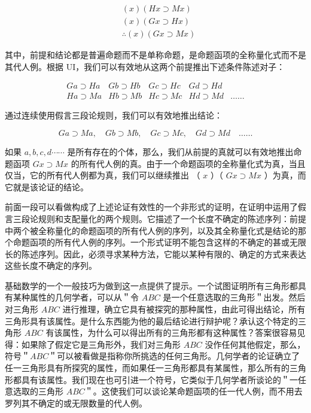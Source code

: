 $$
\begin{aligned}
& (x)(H x \supset M x) \\
& (x)(G x \supset H x) \\
& \therefore(x)(G x \supset M x)
\end{aligned}
$$

其中，前提和结论都是普遍命题而不是单称命题，是命题函项的全称量化式而不是其代人例。根据 UI，我们可以有效地从这两个前提推出下述条件陈述对子：

$$
\begin{array}{lllll}
G a \supset H a & G b \supset H b & G c \supset H c & G d \supset H d & \\
H a \supset M a & H b \supset M b & H c \supset M c & H d \supset M d & \ldots \ldots
\end{array}
$$

通过连续使用假言三段论规则，我们可以有效地推出结论：

$$
G a \supset M a, \quad G b \supset M b, \quad G c \supset M c, \quad G d \supset M d \quad \ldots \ldots
$$

如果 $a, b, c, d \cdots \cdots$ 是所有存在的个体，那么，我们从前提的真就可以有效地推出命题函项 $G x \supset M x$ 的所有代人例的真。由于一个命题函项的全称量化式为真，当且仅当，它的所有代人例都为真，我们可以继续推出 （ $x$ ）（ $G x \supset M x$ ）为真，而它就是该论证的结论。

前面一段可以看做构成了上述论证有效性的一个非形式的证明，在证明中运用了假言三段论规则和支配量化的两个规则。它描述了一个长度不确定的陈述序列：前提中两个被全称量化的命题函项的所有代人例的序列，以及其全称量化式是结论的那个命题函项的所有代人例的序列。一个形式证明不能包含这样的不确定的甚或无限长的陈述序列。因此，必须寻求某种方法，它能以某种有限的、确定的方式来表达这些长度不确定的序列。

基础数学的一个一般技巧为做到这一点提供了提示。一个试图证明所有三角形都具有某种属性的几何学者，可以从＂令 $A B C$ 是一个任意选取的三角形＂出发。然后对三角形 $A B C$ 进行推理，确立它具有被探究的那种属性，由此可得出结论，所有三角形具有该属性。是什么东西能为他的最后结论进行辩护呢？承认这个特定的三角形 $A B C$ 有该属性，为什么可以得出所有的三角形都有这种属性？答案很容易见得：如果除了假定它是三角形外，我们对三角形 $A B C$ 没作任何其他假定，那么，符号＂$A B C$＂可以被看做是指称你所挑选的任何三角形。几何学者的论证确立了任一三角形具有所探究的属性，而如果任一三角形都具有某属性，那么所有的三角形都具有该属性。我们现在也可引进一个符号，它类似于几何学者所谈论的＂一任意选取的三角形 $A B C$＂。这使我们可以谈论某命题函项的任一代人例，而不用去罗列其不确定的或无限数量的代人例。

